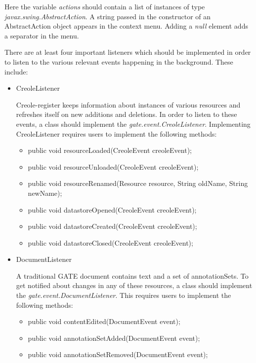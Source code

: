 Here the variable \textit{actions} should contain a list of instances of type
\textit{javax.swing.AbstractAction}. A string passed in the constructor of an
AbstractAction object appears in the context menu. Adding a \textit{null} element
adds a separator in the menu.


There are at least four important listeners which should be implemented in order
to listen to the various relevant events happening in the background. These
include:

\begin{itemize}
\item{CreoleListener}

	Creole-register keeps information about instances of various resources
	and refreshes itself on new additions and deletions. In order to listen
	to these events, a class should implement the
	\textit{gate.event.CreoleListener}. Implementing CreoleListener requires
	users to implement the following methods:

	\begin{itemize}
	\item{public void resourceLoaded(CreoleEvent creoleEvent);}
	\item{public void resourceUnloaded(CreoleEvent creoleEvent);}
	\item{public void resourceRenamed(Resource resource, String oldName, String newName);}
  	\item{public void datastoreOpened(CreoleEvent creoleEvent);}
   	\item{public void datastoreCreated(CreoleEvent creoleEvent);}
   	\item{public void datastoreClosed(CreoleEvent creoleEvent);}
	\end{itemize}

\item{DocumentListener}

	A traditional GATE document contains text and a set of annotationSets.
	To get notified about changes in any of these resources, a class should
	implement the \textit{gate.event.DocumentListener}. This requires users
	to implement the following methods:

	\begin{itemize}
	\item{public void contentEdited(DocumentEvent event);}
	\item{public void annotationSetAdded(DocumentEvent event);}
	\item{public void annotationSetRemoved(DocumentEvent event);}
	\end{itemize}


\end{itemize}
